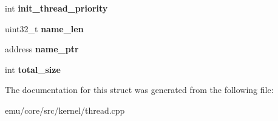 \begin{DoxyCompactItemize}
int {\bfseries init\+\_\+thread\+\_\+priority}
\item 
\mbox{\label{structeka2l1_1_1kernel_1_1epoc9__thread__create__info_a6567156fa5e1d3d7a9adb81084edff88}} 
uint32\+\_\+t {\bfseries name\+\_\+len}
\item 
\mbox{\label{structeka2l1_1_1kernel_1_1epoc9__thread__create__info_a0d08c9777d0fc174014a5329acb2a120}} 
address {\bfseries name\+\_\+ptr}
\item 
\mbox{\label{structeka2l1_1_1kernel_1_1epoc9__thread__create__info_abd0b641f5efc1f2602fa99a92e4f667d}} 
int {\bfseries total\+\_\+size}
\end{DoxyCompactItemize}


The documentation for this struct was generated from the following file\+:\begin{DoxyCompactItemize}
\item 
emu/core/src/kernel/thread.\+cpp\end{DoxyCompactItemize}
